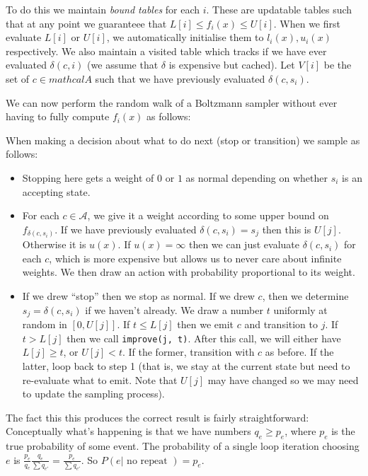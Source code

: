 \documentclass[a4paper]{book}
\begin{document}
To do this we maintain \emph{bound tables} for each \(i\).
These are updatable tables such that at any point we guaranteee that \(L[i] \leq f_i(x) \leq U[i]\).
When we first evaluate \(L[i]\) or \(U[i]\),
we automatically initialise them to \(l_i(x), u_i(x)\) respectively.
We also maintain a visited table which tracks if we have ever evaluated \(\delta(c, i)\) (we assume that \(\delta\) is expensive but cached).
Let \(V[i]\) be the set of \(c \in mathcal{A}\) such that we have previously evaluated \(\delta(c, s_i)\).

We can now perform the random walk of a Boltzmann sampler without ever having to fully compute \(f_i(x)\) as follows:

When making a decision about what to do next (stop or transition) we sample as follows:

\begin{itemize}
\item Stopping here gets a weight of \(0\) or \(1\) as normal depending on whether \(s_i\) is an accepting state.
\item For each \(c \in \mathcal{A}\), we give it a weight according to some upper bound on \(f_{\delta(c, s_i)}\).
If we have previously evaluated \(\delta(c, s_i) = s_j\) then this is \(U[j]\).
Otherwise it is \(u(x)\).
If \(u(x) = \infty\) then we can just evaluate \(\delta(c, s_i)\) for each \(c\),
which is more expensive but allows us to never care about infinite weights.
We then draw an action with probability proportional to its weight.
\item If we drew ``stop'' then we stop as normal.
If we drew \(c\), then we determine \(s_j = \delta(c, s_i)\) if we haven't already.
We draw a number \(t\) uniformly at random in \([0, U[j]]\).
If \(t \leq L[j]\) then we emit \(c\) and transition to \(j\).
If \(t > L[j]\) then we call \texttt{improve(j, t)}.
After this call,
we will either have \(L[j] \geq t\),
or \(U[j] < t\).
If the former, transition with \(c\) as before.
If the latter, loop back to step 1 (that is, we stay at the current state but need to re-evaluate what to emit. Note that \(U[j]\) may have changed so we may need to update the sampling process).
\end{itemize}

The fact this this produces the correct result is fairly straightforward:
Conceptually what's happening is that we have numbers \(q_e \geq p_e\),
where \(p_e\) is the true probability of some event.
The probability of a single loop iteration choosing \(e\) is \(\frac{p_e}{q_e} \frac{q_e}{\sum q_{e'}} = \frac{p_e}{\sum q_{e'}}\).
So \(P(e| \text{ no repeat }) = p_e\).
\end{document}

